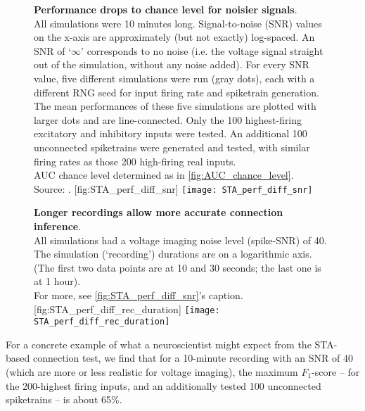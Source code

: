 \begin{figure}
    \begin{sidecaption}
        {\textbf{Performance drops to chance level for noisier signals}.\\
        All simulations were 10 minutes long.
        Signal-to-noise (SNR) values on the x-axis are approximately (but not exactly) log-spaced. An SNR of `$\infty$' corresponds to no noise (i.e. the voltage signal straight out of the simulation, without any noise added).
        For every SNR value, five different simulations were run (gray dots), each with a different RNG seed for input firing rate and spiketrain generation. The mean performances of these five simulations are plotted with larger dots and are line-connected.
        Only the 100 highest-firing excitatory and inhibitory inputs were tested. An additional 100 unconnected spiketrains were generated and tested, with similar firing rates as those 200 high-firing real inputs.\\
        AUC chance level determined as in \cref{fig:AUC_chance_level}.\\
        Source: .}
        [fig:STA_perf_diff_snr]
        \texttt{[image: STA\_perf\_diff\_snr]}
    \end{sidecaption}
\end{figure}

\begin{figure}
    \begin{sidecaption}
        {\textbf{Longer recordings allow more accurate connection inference}.\\
        All simulations had a voltage imaging noise level (spike-SNR) of 40.\\
        The simulation (`recording') durations are on a logarithmic axis. (The first two data points are at 10 and 30 seconds; the last one is at 1 hour). \\
        For more, see \cref{fig:STA_perf_diff_snr}'s caption.}
        [fig:STA_perf_diff_rec_duration]
        \texttt{[image: STA\_perf\_diff\_rec\_duration]}
    \end{sidecaption}
\end{figure}

For a concrete example of what a neuroscientist might expect from the STA-based connection test, we find that for a 10-minute recording with an SNR of 40 (which are more or less realistic for voltage imaging), the maximum $F_1$-score -- for the 200-highest firing inputs, and an additionally tested 100 unconnected spiketrains -- is about 65\%.

